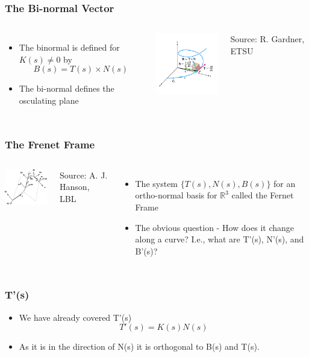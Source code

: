 \documentclass[10pt]{beamer}
\begin{document}
\begin{frame}
  \frametitle{The Bi-normal Vector}
  \begin{columns}
    \column{7cm}
    \begin{itemize}
    \item The binormal is defined for $K(s) \neq 0$ by
      \[
        B(s) = T(s) \times N(s)
      \]
    \item The bi-normal defines the osculating plane
    \end{itemize}
    \column{4cm}
    \vfill
    \centerline{\includegraphics[width=3.5cm]{binormal}}
    \vfill
    Source: R. Gardner, ETSU
  \end{columns}
\end{frame}

\begin{frame}
  \frametitle{The Frenet Frame}
  \begin{columns}
    \column{5cm}
    \vfill
    \centerline{\includegraphics[width=3.8cm]{frenet-frame}}
    \vfill
    Source: A. J. Hanson, LBL
    \column{6cm}
    \begin{itemize}
    \item The system $\{ T(s), N(s), B(s) \}$ for an ortho-normal basis for $\mathbb{R}^3$ called the Fernet Frame
    \item The obvious question - How does it change along a curve? I.e., what are T'(s), N'(s), and B'(s)?
    \end{itemize}
  \end{columns}
\end{frame}

\begin{frame}
  \frametitle{T'(s)}
  \begin{itemize}
  \item We have already covered T'(s)
    \[
      T'(s) = K(s) N(s)
    \]

  \item As it is in the direction of N(s) it is orthogonal to B(s) and T(s). 
  \end{itemize}
\end{frame}
\end{document}
